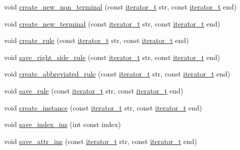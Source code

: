 \begin{DoxyCompactItemize}
\item 
void \hyperlink{namespacegenevalmag_a6d8584e0b692b4a20384e0742b22630a}{create\_\-new\_\-non\_\-terminal} (const \hyperlink{namespacegenevalmag_a64946721fb97e58be670a468bf8e7056}{iterator\_\-t} str, const \hyperlink{namespacegenevalmag_a64946721fb97e58be670a468bf8e7056}{iterator\_\-t} end)
\item 
void \hyperlink{namespacegenevalmag_a3ab01d2c2dc547707d49394c59211460}{create\_\-new\_\-terminal} (const \hyperlink{namespacegenevalmag_a64946721fb97e58be670a468bf8e7056}{iterator\_\-t} str, const \hyperlink{namespacegenevalmag_a64946721fb97e58be670a468bf8e7056}{iterator\_\-t} end)
\item 
void \hyperlink{namespacegenevalmag_a38a9e6cd331b8e5caad524d12229d71e}{create\_\-rule} (const \hyperlink{namespacegenevalmag_a64946721fb97e58be670a468bf8e7056}{iterator\_\-t} str, const \hyperlink{namespacegenevalmag_a64946721fb97e58be670a468bf8e7056}{iterator\_\-t} end)
\item 
void \hyperlink{namespacegenevalmag_ab3b5ed3e86e091b48713f1e3a0065d9c}{save\_\-right\_\-side\_\-rule} (const \hyperlink{namespacegenevalmag_a64946721fb97e58be670a468bf8e7056}{iterator\_\-t} str, const \hyperlink{namespacegenevalmag_a64946721fb97e58be670a468bf8e7056}{iterator\_\-t} end)
\item 
void \hyperlink{namespacegenevalmag_abd826b7a45bf0c29f45dc8f8c64c0805}{create\_\-abbreviated\_\-rule} (const \hyperlink{namespacegenevalmag_a64946721fb97e58be670a468bf8e7056}{iterator\_\-t} str, const \hyperlink{namespacegenevalmag_a64946721fb97e58be670a468bf8e7056}{iterator\_\-t} end)
\item 
void \hyperlink{namespacegenevalmag_ab100c06acfd394415ddcf909a5c9490f}{save\_\-rule} (const \hyperlink{namespacegenevalmag_a64946721fb97e58be670a468bf8e7056}{iterator\_\-t} str, const \hyperlink{namespacegenevalmag_a64946721fb97e58be670a468bf8e7056}{iterator\_\-t} end)
\item 
void \hyperlink{namespacegenevalmag_a61de26b3fdfcf0998039df573a3ec6f0}{create\_\-instance} (const \hyperlink{namespacegenevalmag_a64946721fb97e58be670a468bf8e7056}{iterator\_\-t} str, const \hyperlink{namespacegenevalmag_a64946721fb97e58be670a468bf8e7056}{iterator\_\-t} end)
\item 
void \hyperlink{namespacegenevalmag_a8f0dbc1c191c7c3e357c9930692e180e}{save\_\-index\_\-ins} (int const index)
\item 
void \hyperlink{namespacegenevalmag_a741fa074f83ccbe1fc90a53eb3635ba8}{save\_\-attr\_\-ins} (const \hyperlink{namespacegenevalmag_a64946721fb97e58be670a468bf8e7056}{iterator\_\-t} str, const \hyperlink{namespacegenevalmag_a64946721fb97e58be670a468bf8e7056}{iterator\_\-t} end)

\end{DoxyCompactItemize}

